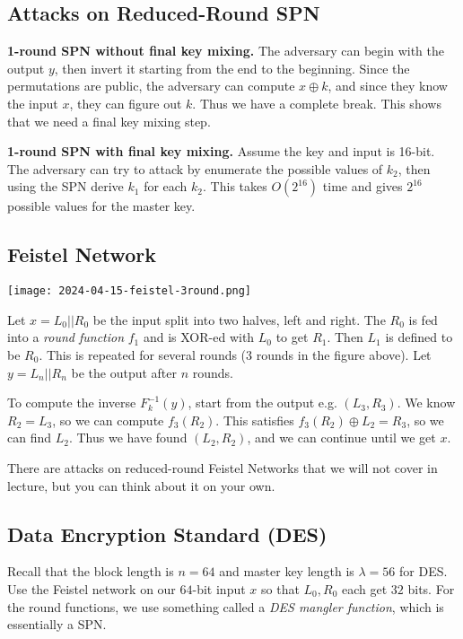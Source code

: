 \subsection{Attacks on Reduced-Round SPN}

\textbf{1-round SPN without final key mixing.} The adversary can begin with the output $y$, then invert it starting from the end to the beginning. Since the permutations are public, the adversary can compute $x \oplus k$, and since they know the input $x$, they can figure out $k$. Thus we have a complete break. This shows that we need a final key mixing step.

\textbf{1-round SPN with final key mixing.} Assume the key and input is 16-bit. The adversary can try to attack by enumerate the possible values of $k_2$, then using the SPN derive $k_1$ for each $k_2$. This takes $O(2^{16})$ time and gives $2^{16}$ possible values for the master key.

\subsection{Feistel Network}

\begin{center}
    \texttt{[image: 2024-04-15-feistel-3round.png]}
\end{center}

Let $x = L_0 || R_0$ be the input split into two halves, left and right. The $R_0$ is fed into a \textit{round function} $f_1$ and is XOR-ed with $L_0$ to get $R_1$. Then $L_1$ is defined to be $R_0$. This is repeated for several rounds (3 rounds in the figure above). Let $y= L_n || R_n$ be the output after $n$ rounds.

To compute the inverse $F_k^{-1}(y)$, start from the output e.g. $(L_3, R_3)$. We know $R_2 = L_3$, so we can compute $f_3(R_2)$. This satisfies $f_3(R_2) \oplus L_2 = R_3$, so we can find $L_2$. Thus we have found $(L_2, R_2)$, and we can continue until we get $x$.

There are attacks on reduced-round Feistel Networks that we will not cover in lecture, but you can think about it on your own.

\subsection{Data Encryption Standard (DES)}

Recall that the block length is $n=64$ and master key length is $\lambda = 56$ for DES. Use the Feistel network on our $64$-bit input $x$ so that $L_0, R_0$ each get $32$ bits. For the round functions, we use something called a \textit{DES mangler function}, which is essentially a SPN.

